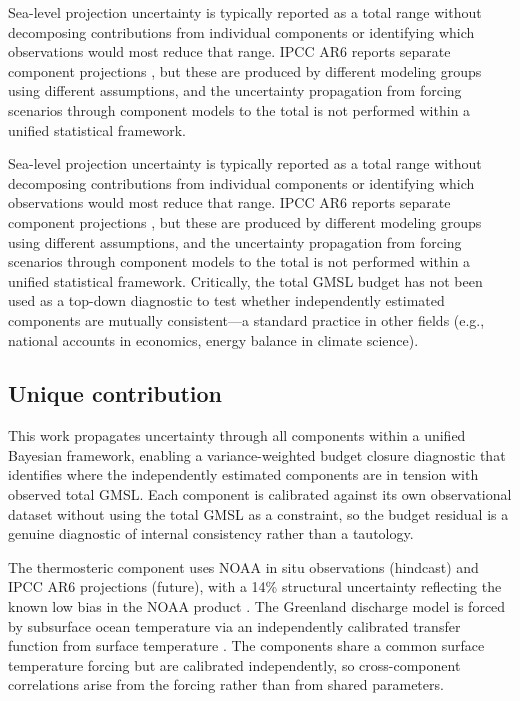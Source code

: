 \documentclass[11pt]{article}
\begin{document}
Sea-level projection uncertainty is typically reported as a total range without decomposing contributions from individual components or identifying which observations would most reduce that range. IPCC AR6 reports separate component projections \citep{Fox-Kemper2021}, but these are produced by different modeling groups using different assumptions, and the uncertainty propagation from forcing scenarios through component models to the total is not performed within a unified statistical framework.

Sea-level projection uncertainty is typically reported as a total range without decomposing contributions from individual components or identifying which observations would most reduce that range. IPCC AR6 reports separate component projections \citep{Fox-Kemper2021}, but these are produced by different modeling groups using different assumptions, and the uncertainty propagation from forcing scenarios through component models to the total is not performed within a unified statistical framework. Critically, the total GMSL budget has not been used as a top-down diagnostic to test whether independently estimated components are mutually consistent---a standard practice in other fields (e.g., national accounts in economics, energy balance in climate science).

\subsection{Unique contribution}

This work propagates uncertainty through all components within a unified Bayesian framework, enabling a variance-weighted budget closure diagnostic that identifies where the independently estimated components are in tension with observed total GMSL. Each component is calibrated against its own observational dataset without using the total GMSL as a constraint, so the budget residual is a genuine diagnostic of internal consistency rather than a tautology.

The thermosteric component uses NOAA in situ observations (hindcast) and IPCC AR6 projections (future), with a 14\% structural uncertainty reflecting the known low bias in the NOAA product \citep{Li2022}. The Greenland discharge model is forced by subsurface ocean temperature via an independently calibrated transfer function from surface temperature \citep{Good2013, Rohde2020}. The components share a common surface temperature forcing but are calibrated independently, so cross-component correlations arise from the forcing rather than from shared parameters.
\end{document}
